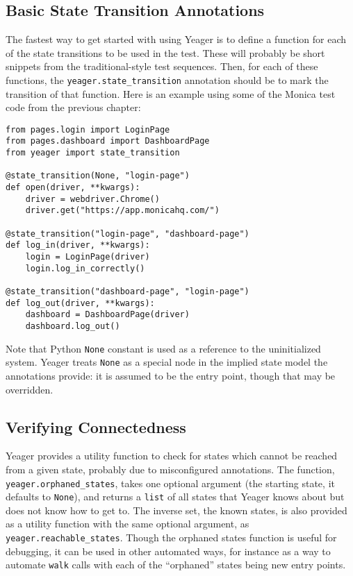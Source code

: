 \subsection{Basic State Transition Annotations}
The fastest way to get started with using Yeager is to define a function for each of the state transitions to be used in the test. These will probably be short snippets from the traditional-style test sequences. Then, for each of these functions, the \texttt{yeager.state\_transition} annotation should be to mark the transition of that function. Here is an example using some of the Monica test code from the previous chapter:

\pagebreak\begin{Verbatim}[fontsize=\small, baselinestretch=0.75]
from pages.login import LoginPage
from pages.dashboard import DashboardPage
from yeager import state_transition

@state_transition(None, "login-page")
def open(driver, **kwargs):
    driver = webdriver.Chrome()
    driver.get("https://app.monicahq.com/")

@state_transition("login-page", "dashboard-page")
def log_in(driver, **kwargs):
    login = LoginPage(driver)
    login.log_in_correctly()

@state_transition("dashboard-page", "login-page")
def log_out(driver, **kwargs):
    dashboard = DashboardPage(driver)
    dashboard.log_out()
\end{Verbatim}

Note that Python \texttt{None} constant is used as a reference to the uninitialized system. Yeager treats \texttt{None} as a special node in the implied state model the annotations provide: it is assumed to be the entry point, though that may be overridden.

\subsection{Verifying Connectedness}
Yeager provides a utility function to check for states which cannot be reached from a given state, probably due to misconfigured annotations. The function, \texttt{yeager.orphaned\_states}, takes one optional argument (the starting state, it defaults to \texttt{None}), and returns a \texttt{list} of all states that Yeager knows about but does not know how to get to. The inverse set, the known states, is also provided as a utility function with the same optional argument, as \\\texttt{yeager.reachable\_states}. Though the orphaned states function is useful for debugging, it can be used in other automated ways, for instance as a way to automate \texttt{walk} calls with each of the ``orphaned'' states being new entry points.

